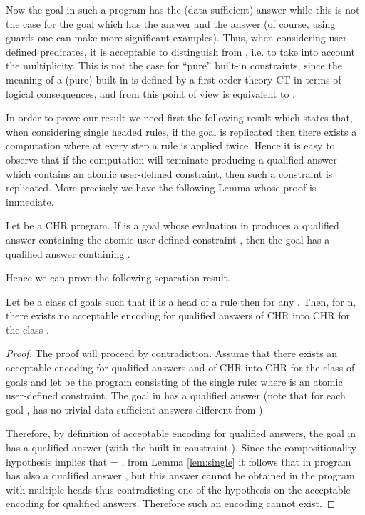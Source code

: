 Now the goal  in such a program has the (data sufficient) answer   while this is not the case for the goal  which has the answer   and the answer  (of course, using guards one can make more significant examples). Thus, when considering user-defined predicates, it is acceptable to distinguish   from , i.e. to take into account the multiplicity. This is not the case for  ``pure'' built-in constraints, since the meaning of a (pure) built-in is defined by a first order theory CT in terms of logical consequences,  and from this point of view  is equivalent to .

In order to prove our result we need first the following result which states that, when considering single headed rules, if the goal is replicated then there exists a computation where at every step a rule is applied twice. Hence it is easy to observe that if the computation will terminate producing a qualified answer which contains an atomic user-defined constraint, then such a constraint is replicated. More precisely we have the following Lemma whose proof is immediate.

\begin{lemma}\label{lem:single}
 Let  be a CHR program. If  is a goal whose evaluation in  produces a qualified answer  containing the atomic user-defined constraint , then the goal  has a qualified answer containing .
\end{lemma}

Hence we can prove the following separation result.


\begin{theorem}
Let  be a class of goals such that if    is a head of a rule then  for any . Then, for n, there exists no acceptable encoding for qualified answers of CHR into CHR for the class .
\end{theorem}

\begin{proof}
The proof will proceed by contradiction. Assume that there exists an acceptable encoding for qualified answers
 and 
 of CHR into CHR for the class of goals  and let  be the program consisting of the single rule:
 where  is an atomic user-defined constraint. The goal  in  has a qualified answer  (note that for each goal ,  has no trivial data sufficient answers different from ).

Therefore, by definition of acceptable encoding for qualified answers, the goal
   in  has a qualified answer  (with the built-in constraint ).
Since the compositionality hypothesis implies that   =
, from Lem\-ma \ref{lem:single} it follows that  in program  has also a qualified answer , but this answer cannot be obtained in the program with multiple heads thus contradicting one of the hypothesis on the acceptable encoding for qualified answers.
Therefore such an encoding cannot exist.
\end{proof}

